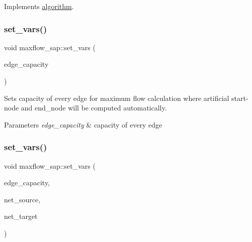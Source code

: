 Implements \mbox{\hyperlink{classalgorithm_a734b189509a8d6b56b65f8ff772d43ca}{algorithm}}.

\mbox{\label{classmaxflow__sap_ac50ba0330c169c7ce697947a76702e13}} 
\subsubsection{\texorpdfstring{set\+\_\+vars()}{set\_vars()}\hspace{0.1cm}{\footnotesize\ttfamily [1/2]}}
{\footnotesize\ttfamily void maxflow\+\_\+sap\+::set\+\_\+vars (\begin{DoxyParamCaption}\item[{const \mbox{\hyperlink{classedge__map}{edge\+\_\+map}}$<$ double $>$ \&}]{edge\+\_\+capacity }\end{DoxyParamCaption})}

Sets capacity of every edge for maximum flow calculation where artificial start-\/node and end\+\_\+node will be computed automatically.


\begin{DoxyParams}{Parameters}
{\em edge\+\_\+capacity} & capacity of every edge \\
\hline
\end{DoxyParams}
\mbox{\label{classmaxflow__sap_a936f6afa25de80046c7bd69dc47fdfa9}} 
\subsubsection{\texorpdfstring{set\+\_\+vars()}{set\_vars()}\hspace{0.1cm}{\footnotesize\ttfamily [2/2]}}
{\footnotesize\ttfamily void maxflow\+\_\+sap\+::set\+\_\+vars (\begin{DoxyParamCaption}\item[{const \mbox{\hyperlink{classedge__map}{edge\+\_\+map}}$<$ double $>$ \&}]{edge\+\_\+capacity,  }\item[{const \mbox{\hyperlink{classnode}{node}} \&}]{net\+\_\+source,  }\item[{const \mbox{\hyperlink{classnode}{node}} \&}]{net\+\_\+target }\end{DoxyParamCaption})}

